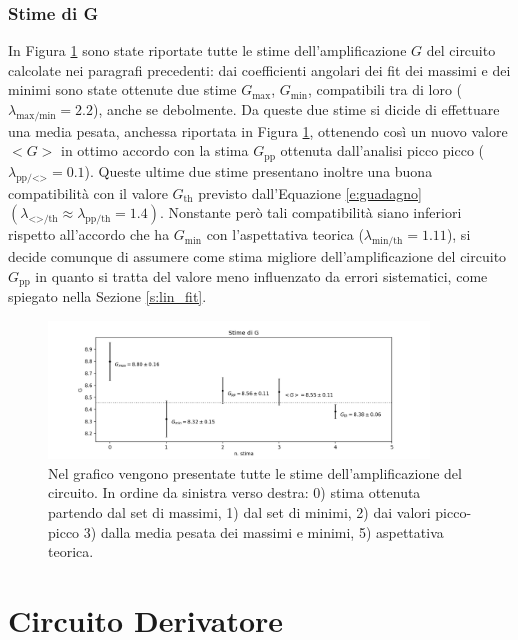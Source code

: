 \documentclass[a4paper,11pt]{article}
\begin{document}
\subsubsection{Stime di G}
In Figura \ref{fig:all} sono state riportate tutte le stime dell'amplificazione $G$ del circuito calcolate nei paragrafi precedenti: dai coefficienti angolari dei fit dei massimi e dei
minimi sono state ottenute due stime $G_{\text{max}}$, $G_{\text{min}}$, compatibili tra di loro
($\lambda_{\text{max/min}}=2.2$), anche se debolmente. Da queste due stime si dicide di effettuare una media pesata, anchessa riportata in Figura \ref{fig:all}, ottenendo così un nuovo valore $<G>$ in ottimo accordo con la stima $G_{\text{pp}}$ ottenuta dall'analisi picco picco ($\lambda_{\text{pp/<>}}=0.1$). Queste ultime due stime presentano
inoltre una buona compatibilità con il valore $G_{\text{th}}$ previsto dall'Equazione \ref{e:guadagno}
$(\lambda_{\text{<>/th}} \approx \lambda_{\text{pp/th}} = 1.4)$.
Nonstante però tali compatibilità siano inferiori rispetto all'accordo che ha $G_{\text{min}}$ con l'aspettativa teorica ($\lambda_{\text{min/th}}=1.11$), si decide comunque di assumere come stima migliore dell'amplificazione
del circuito $G_{\text{pp}}$ in quanto si tratta del valore meno influenzato da errori sistematici, come spiegato nella Sezione \ref{s:lin_fit}.
\begin{figure}[h]
\centering
\includegraphics[width=0.9\textwidth]{images/grafico_all}
\caption{\footnotesize Nel grafico vengono presentate tutte le stime dell'amplificazione del circuito.
  In ordine da sinistra verso destra: 0) stima ottenuta partendo dal set di massimi, 1) dal set di minimi,
  2) dai valori picco-picco 3) dalla media pesata dei massimi e minimi, 5) aspettativa teorica.
}\label{fig:all}
\end{figure}

\section{Circuito Derivatore}
\label{sec:circuito-derivatore}
\end{document}
